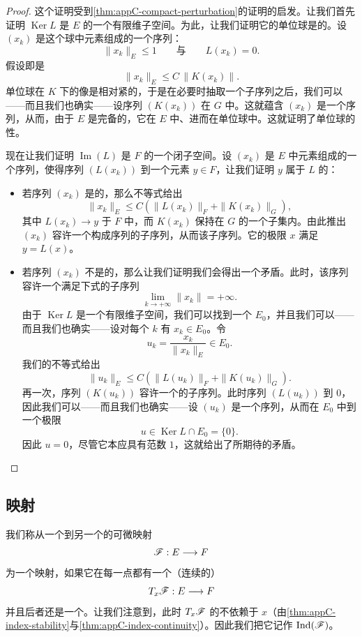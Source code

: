 \begin{proof}
这个证明受到\cref{thm:appC-compact-perturbation}的证明的启发。让我们首先证明 $\operatorname{Ker} L$ 是 $E$ 的一个有限维子空间。为此，让我们证明它的单位球是\trCompact{}的。设 $(x_k)$ 是这个球中元素组成的一个序列：
\[
\|x_k\|_E \le 1 \qquad\text{与}\qquad L(x_k) = 0.
\]
假设即是
\[
\|x_k\|_E \le C\,\|K(x_k)\|.
\]
单位球在 $K$ 下的像是相对紧的，于是在必要时抽取一个子序列之后，我们可以——而且我们也确实——设序列 $(K(x_k))$ 在 $G$ 中\trConvergence。这就蕴含 $(x_k)$ 是一个\trCauchy{}序列，从而，由于 $E$ 是完备的，它在 $E$ 中、进而在单位球中\trConvergence。这就证明了单位球的\trCompact{}性。

现在让我们证明 $\operatorname{Im}(L)$ 是 $F$ 的一个闭子空间。设 $(x_k)$ 是 $E$ 中元素组成的一个序列，使得序列 $(L(x_k))$ \trConvergence{}到一个元素 $y \in F$，让我们证明 $y$ 属于 $L$ 的\trImage：
\begin{itemize}
\item 若序列 $(x_k)$ 是\trBounded{}的，那么不等式给出
\[
\|x_k\|_E \le C \left( \|L(x_k)\|_F + \|K(x_k)\|_G \right),
\]
其中 $L(x_k) \to y$ 于 $F$ 中，而 $K(x_k)$ 保持在 $G$ 的一个\trCompact{}子集内。由此推出 $(x_k)$ 容许一个构成\trCauchy{}序列的子序列，从而该子序列\trConvergence。它的极限 $x$ 满足 $y = L(x)$。
\item 若序列 $(x_k)$ 不是\trBounded{}的，那么让我们证明我们会得出一个矛盾。此时，该序列容许一个满足下式的子序列
\[
\lim_{k \to +\infty} \|x_k\| = +\infty.
\]
由于 $\operatorname{Ker} L$ 是一个有限维子空间，我们可以找到一个\trComplement{} $E_0$，并且我们可以——而且我们也确实——设对每个 $k$ 有 $x_k \in E_0$。令
\[
u_k = \frac{x_k}{\|x_k\|_E} \in E_0.
\]
我们的不等式给出
\[
\|u_k\|_E \le C \left( \|L(u_k)\|_F + \|K(u_k)\|_G \right).
\]
再一次，序列 $(K(u_k))$ 容许一个\trConvergence{}的子序列。此时序列 $(L(u_k))$ \trConvergence{}到 $0$，因此我们可以——而且我们也确实——设 $(u_k)$ 是一个\trCauchy{}序列，从而在 $E_0$ 中\trConvergence{}到一个极限
\[
u \in \operatorname{Ker} L \cap E_0 = \{0\}.
\]
因此 $u = 0$，尽管它本应具有范数 $1$，这就给出了所期待的矛盾。
\end{itemize}
\end{proof}

\subsection{\trFredholm{}映射}
\label{subsec:appC-fredholm-maps}

我们称从一个\trBanachSpace{}到另一个\trBanachSpace{}的可微映射
\[
\mathscr{F} : E \longrightarrow F
\]
为一个\trFredholm{}映射，如果它在每一点都有一个（连续的）\trDifferential
\[
T_x\mathscr{F} : E \longrightarrow F
\]
并且后者还是一个\trFredholmOperator。让我们注意到，此时 $T_x\mathscr{F}$ 的\trIndex{}不依赖于 $x$（由\cref{thm:appC-index-stability}与\cref{thm:appC-index-continuity}）。因此我们把它记作 $\operatorname{Ind}(\mathscr{F})$。

